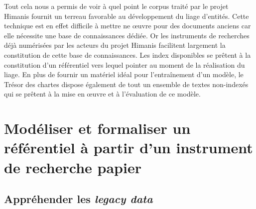 \documentclass[a4paper,12pt,twoside]{book}
\makeatletter
\newcommand{\parttext}[1]{\def\@parttext{#1}}
\makeatother
\begin{document}
	Tout cela nous a permis de voir à quel point le corpus traité par le projet Himanis fournit un terreau favorable au développement du liage d'entités. Cette technique est en effet difficile à mettre ne œuvre pour des documents anciens car elle nécessite une base de connaissances dédiée. Or les instruments de recherches déjà numérisées par les acteurs du projet Himanis facilitent largement la constitution de cette base de connaissances. Les index disponibles se prêtent à la constitution d'un référentiel vers lequel pointer au moment de la réalisation du liage. En plus de fournir un matériel idéal pour l'entraînement d'un modèle, le Trésor des chartes dispose également de tout un ensemble de textes non-indexés qui se prêtent à la mise en œuvre et à l'évaluation de ce modèle.
	
	\parttext{Le stage que nous avons réalisé s'est principalement concentré sur la constitution d'un référentiel pouvant servir de base de connaissances pour la mise en œuvre du liage d'entités. Nous consacrerons donc cette deuxième partie au travail de modélisation et de formalisation de ce référentiel à partir d'un index papier, activité qui a occupé la majeure partie de notre stage. Nous nous sommes concentrés ici sur l'index du premier volume de l'inventaire analytique des registres du Trésor des chartes portant sur les registres JJ 37 à JJ 50 et paru en 1958. Pour rendre compte de ce travail, nous décrirons dans un premier chapitre les différentes difficultés rencontrées pour comprendre et manipuler cet instrument de recherche. Puis nous dédierons un second chapitre à l'analyse des relations entre les entités. Nous consacrerons enfin un troisième chapitre à la transformation de l'index en une base de données relationnelle.}
	
	\part{Modéliser et formaliser un référentiel à partir d’un instrument de recherche papier}
	
	
	\chapter{Appréhender les \textit{legacy data}}
	
\end{document}
